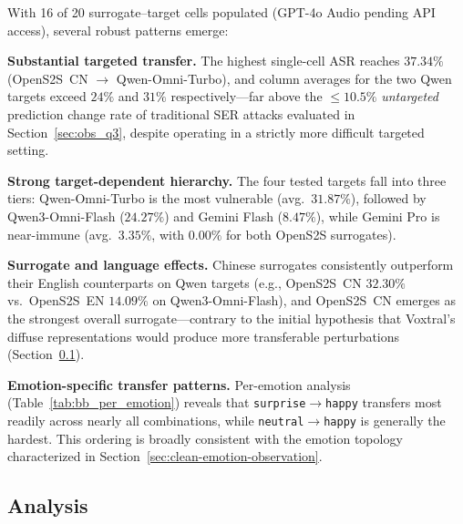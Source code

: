 With 16 of 20 surrogate--target cells populated (GPT-4o Audio pending API access), several robust patterns emerge:

\begin{packeditemize}
\item \textbf{Substantial targeted transfer.}
The highest single-cell ASR reaches $37.34\%$ (OpenS2S~CN $\to$ Qwen-Omni-Turbo), and column averages for the two Qwen targets exceed $24\%$ and $31\%$ respectively---far above the $\leq\!10.5\%$ \textit{untargeted} prediction change rate of traditional SER attacks evaluated in Section~\ref{sec:obs_q3}, despite operating in a strictly more difficult targeted setting.

\item \textbf{Strong target-dependent hierarchy.}
The four tested targets fall into three tiers: Qwen-Omni-Turbo is the most vulnerable (avg.\ $31.87\%$), followed by Qwen3-Omni-Flash ($24.27\%$) and Gemini Flash ($8.47\%$), while Gemini Pro is near-immune (avg.\ $3.35\%$, with $0.00\%$ for both OpenS2S surrogates).

\item \textbf{Surrogate and language effects.}
Chinese surrogates consistently outperform their English counterparts on Qwen targets (e.g., OpenS2S~CN $32.30\%$ vs.\ OpenS2S~EN $14.09\%$ on Qwen3-Omni-Flash), and OpenS2S~CN emerges as the strongest overall surrogate---contrary to the initial hypothesis that Voxtral's diffuse representations would produce more transferable perturbations (Section~\ref{sec:bb_analysis}).

\item \textbf{Emotion-specific transfer patterns.}
Per-emotion analysis (Table~\ref{tab:bb_per_emotion}) reveals that \texttt{surprise}$\to$\texttt{happy} transfers most readily across nearly all combinations, while \texttt{neutral}$\to$\texttt{happy} is generally the hardest.
This ordering is broadly consistent with the emotion topology characterized in Section~\ref{sec:clean-emotion-observation}.
\end{packeditemize}

\subsection{Analysis}
\label{sec:bb_analysis}

